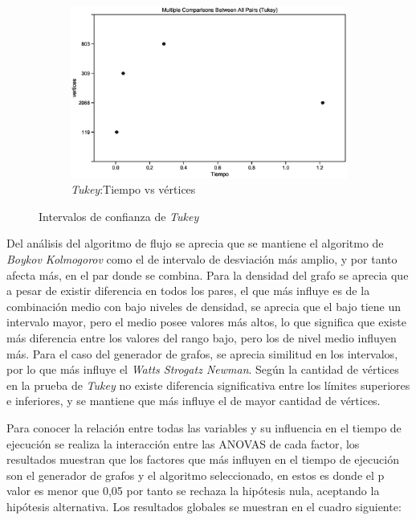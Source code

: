 \documentclass{article}
\begin{document}
\begin{figure}[htbp]
\begin{subfigure}{0.5\textwidth}
\includegraphics[width=0.9\linewidth]{Imagenes/tablatukeyvertices.eps}
\caption{\textit{Tukey}:Tiempo vs vértices}
\end{subfigure}
 
\caption{Intervalos de confianza de \textit{Tukey}}
\label{fig:Fig3}
\end{figure}

Del análisis del algoritmo de flujo se aprecia que se mantiene el algoritmo de \textit{Boykov Kolmogorov} 
como el de intervalo de desviación más amplio, y por tanto afecta más, en el par donde se combina. Para la densidad del grafo se aprecia que a pesar de existir diferencia en todos los pares, el que más influye es de la combinación medio con bajo niveles de densidad, se aprecia que el bajo tiene un intervalo mayor, pero el medio posee valores más altos, lo que significa que existe más diferencia entre los valores del rango bajo, pero los de nivel medio influyen más. Para el caso del generador de grafos, se aprecia similitud en los intervalos, por lo que más influye el \textit{Watts Strogatz Newman}. Según la cantidad de vértices en la prueba de \textit{Tukey} no existe diferencia significativa entre los límites superiores e inferiores, y se mantiene que más influye el de mayor cantidad de vértices.

Para conocer la relación entre todas las variables y su influencia en el tiempo de ejecución se realiza la interacción entre las ANOVAS de cada factor, los resultados muestran que los factores que más influyen en el tiempo de ejecución son el generador de grafos y el algoritmo seleccionado, en estos es donde el p\- valor es menor que 0,05 por tanto se rechaza la hipótesis nula, aceptando la hipótesis alternativa. Los resultados globales se muestran en el cuadro siguiente:
\end{document}
